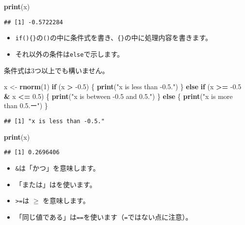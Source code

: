 \documentclass[]{bxjsarticle}
\newenvironment{Shaded}{\begin{snugshade}}{\end{snugshade}}
\newcommand{\ControlFlowTok}[1]{\textcolor[rgb]{0.13,0.29,0.53}{\textbf{#1}}}
\newcommand{\DecValTok}[1]{\textcolor[rgb]{0.00,0.00,0.81}{#1}}
\newcommand{\FloatTok}[1]{\textcolor[rgb]{0.00,0.00,0.81}{#1}}
\newcommand{\KeywordTok}[1]{\textcolor[rgb]{0.13,0.29,0.53}{\textbf{#1}}}
\newcommand{\NormalTok}[1]{#1}
\newcommand{\OperatorTok}[1]{\textcolor[rgb]{0.81,0.36,0.00}{\textbf{#1}}}
\newcommand{\StringTok}[1]{\textcolor[rgb]{0.31,0.60,0.02}{#1}}
\providecommand{\tightlist}{%
  \setlength{\itemsep}{0pt}\setlength{\parskip}{0pt}}
\begin{document}
\begin{Shaded}
\begin{Highlighting}[]
\KeywordTok{print}\NormalTok{(x)}
\end{Highlighting}
\end{Shaded}

\begin{verbatim}
## [1] -0.5722284
\end{verbatim}

\begin{itemize}
\tightlist
\item
  \texttt{if()\{\}}の\texttt{()}の中に条件式を書き、\texttt{\{\}}の中に処理内容を書きます。
\item
  それ以外の条件は\texttt{else}で示します。
\end{itemize}

条件式は3つ以上でも構いません。

\begin{Shaded}
\begin{Highlighting}[]
\NormalTok{x <-}\StringTok{ }\KeywordTok{rnorm}\NormalTok{(}\DecValTok{1}\NormalTok{)}
\ControlFlowTok{if}\NormalTok{ (x }\OperatorTok{>}\StringTok{ }\FloatTok{-0.5}\NormalTok{) \{}
  \KeywordTok{print}\NormalTok{(}\StringTok{"x is less than -0.5."}\NormalTok{)}
\NormalTok{\} }\ControlFlowTok{else} \ControlFlowTok{if}\NormalTok{ (x }\OperatorTok{>=}\StringTok{ }\FloatTok{-0.5} \OperatorTok{&}\StringTok{ }\NormalTok{x }\OperatorTok{<=}\StringTok{ }\FloatTok{0.5}\NormalTok{) \{}
  \KeywordTok{print}\NormalTok{(}\StringTok{"x is between -0.5 and 0.5."}\NormalTok{)}
\NormalTok{\} }\ControlFlowTok{else}\NormalTok{ \{}
  \KeywordTok{print}\NormalTok{(}\StringTok{"x is more than 0.5.ー"}\NormalTok{)}
\NormalTok{\}}
\end{Highlighting}
\end{Shaded}

\begin{verbatim}
## [1] "x is less than -0.5."
\end{verbatim}

\begin{Shaded}
\begin{Highlighting}[]
\KeywordTok{print}\NormalTok{(x)}
\end{Highlighting}
\end{Shaded}

\begin{verbatim}
## [1] 0.2696406
\end{verbatim}

\begin{itemize}
\tightlist
\item
  \texttt{\&}は「かつ」を意味します。
\item
  「または」は\texttt{\textbar{}}を使います。
\item
  \texttt{\textgreater{}=}は \(\geq\) を意味します。
\item
  「同じ値である」は\texttt{==}を使います（\texttt{=}ではない点に注意）。
\end{itemize}
\end{document}
